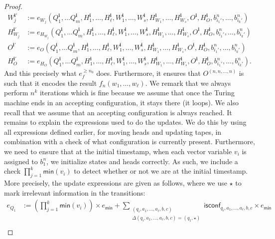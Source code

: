 \begin{proof}
\begin{align*}
		W_j^{\mathbf{i}'}&:=e_{W_j}(Q_1^{\mathbf{i}},\ldots Q_m^{\mathbf{i}},H_1^{\mathbf{i}},\ldots,H_\ell^{\mathbf{i}},W_1^{\mathbf{i}},\ldots,W_s^{\mathbf{i}},H_{W_1}^{\mathbf{i}},\ldots,H_{W_s}^{\mathbf{i}},O^{\mathbf{i}},H_O^{\mathbf{i}},b_{i_1'}^n,\ldots,b_{i_k'}^n)\\
				H_{W_j}^{\mathbf{i}'}&:=e_{H_{W_j}}(Q_1^{\mathbf{i}},\ldots Q_m^{\mathbf{i}},H_1^{\mathbf{i}},\ldots,H_\ell^{\mathbf{i}},W_1^{\mathbf{i}},\ldots,W_s^{\mathbf{i}},H_{W_1}^{\mathbf{i}},\ldots,H_{W_s}^{\mathbf{i}},O^{\mathbf{i}},H_O^{\mathbf{i}},b_{i_1'}^n,\ldots,b_{i_k'}^n)\\
O^{\mathbf{i}'}&:=e_{O}(Q_1^{\mathbf{i}},\ldots Q_m^{\mathbf{i}},H_1^{\mathbf{i}},\ldots,H_\ell^{\mathbf{i}},W_1^{\mathbf{i}},\ldots,W_s^{\mathbf{i}},H_{W_1}^{\mathbf{i}},\ldots,H_{W_s}^{\mathbf{i}},O^{\mathbf{i}},H_O^{\mathbf{i}},b_{i_1'}^n,\ldots,b_{i_k'}^n)\\
H_{O}^{\mathbf{i}'}&:=e_{H_O}(Q_1^{\mathbf{i}},\ldots Q_m^{\mathbf{i}},H_1^{\mathbf{i}},\ldots,H_\ell^{\mathbf{i}},W_1^{\mathbf{i}},\ldots,W_s^{\mathbf{i}},H_{W_1}^{\mathbf{i}},\ldots,H_{W_s}^{\mathbf{i}},O^{\mathbf{i}},H_O^{\mathbf{i}},b_{i_1'}^n,\ldots,b_{i_k'}^n).
	\end{align*}
And this precisely what $e_f^{\geq n_0}$ does. Furthermore,	it ensures that  $O^{(n,n,\ldots,n)}$ is such that it encodes the result $f_n(w_1,\ldots,w_\ell)$. We remark that we
always perform $n^k$ iterations which is fine because we assume that once the Turing machine ends in an accepting configuration,
it stays there (it loops). We also recall that we assume that an accepting configuration is always reached. It remains to
explain the expressions used to do the updates. We do this by using all expressions defined earlier, for moving heads and updating
tapes, in combination with a check of what configuration is currently present. Furthermore, we need to ensure that at the initial timestamp,
when each vector variable $v_i$ is assigned to $b_1^n$, we initialize states and heads correctly. As such, we include a check
$\prod_{j=1}^{k} \textsf{min}(v_i)$ to detect whether or not we are at the initial timestamp. More precisely, the update expressions
are given as follows, where we use $\star$ to mark irrelevant information in the transitions: 
    \begin{align*}   
        e_{Q_1}&:=\left(\prod_{j=1}^{k} \textsf{min}(v_i)\right)\times e_{\mathsf{min}}
        + \sum_{\substack{(q_i,a_1,\ldots,a_\ell,b,c)\\
        \Delta(q_i,a_1,\ldots,a_\ell,b,c)=(q_1,\star)}} \!\!\!\!\!\!\!\!\! \mathsf{isconf}_{q_i,a_1,\ldots,a_\ell,b,c}\times e_{\mathsf{min}} \\

\end{align*}
\end{proof}
